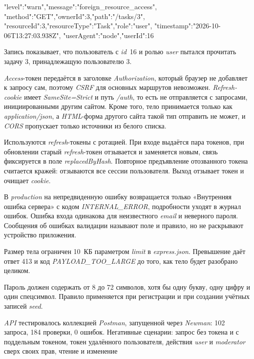 \documentclass{stp}
\begin{document}
\begin{stpnum}
\begin{stplisting}
{ "level":"warn","message":"foreign_resource_access",
 "method":"GET","ownerId":3,"path":"/tasks/3",
 "resourceId":3,"resourceType":"Task","role":"user",
 "timestamp":"2026-10-06T13:27:03.938Z",
 "userAgent":"node","userId":16}
\end{stplisting}
    Запись показывает, что пользователь с \textit{id}~16 и ролью \textit{user} пытался
    прочитать задачу 3, принадлежащую пользователю 3.
  \item \textit{Access}-токен передаётся в заголовке \textit{Authorization}, который
    браузер не добавляет к запросу сам, поэтому \textit{CSRF} для основных
    маршрутов невозможен. \textit{Refresh-cookie} имеет \textit{SameSite=Strict} и путь
    \textit{/auth}, то есть не отправляется с запросами, инициированными другим
    сайтом. Кроме того, тело принимается только как \textit{application/json},
    а \textit{HTML}-форма другого сайта такой тип отправить не может, и \textit{CORS}
    пропускает только источники из белого списка.
  \item Используются \textit{refresh}-токены с ротацией. При входе выдаётся пара
    токенов, при обновлении старый \textit{refresh}-токен отзывается и
    заменяется новым, связь фиксируется в поле \textit{replacedByHash}. Повторное
    предъявление отозванного токена считается кражей: отзываются все
    сессии пользователя. Выход отзывает токен и очищает \textit{cookie}.
  \item В \textit{production} на непредвиденную ошибку возвращается только
    «Внутренняя ошибка сервера» с кодом \textit{INTERNAL\_ERROR}, подробности
    уходят в журнал ошибок. Ошибка входа одинакова для неизвестного
    \textit{email} и неверного пароля. Сообщения об ошибках валидации называют
    поле и правило, но не раскрывают устройство приложения.
  \item Размер тела ограничен 10~КБ параметром \textit{limit} в \textit{express.json}.
    Превышение даёт ответ 413 и код \textit{PAYLOAD\_TOO\_LARGE} до того, как
    тело будет разобрано целиком.
  \item Пароль должен содержать от 8 до 72 символов, хотя бы одну
    букву, одну цифру и один спецсимвол. Правило применяется при
    регистрации и при создании учётных записей \textit{seed}.
  \item \textit{API} тестировалось коллекцией \textit{Postman}, запущенной через \textit{Newman}:
    102 запроса, 184 проверки, 0 ошибок. Негативные сценарии: запрос
    без токена и с поддельным токеном, токен удалённого пользователя,
    действия \textit{user} и \textit{moderator} сверх своих прав, чтение и изменение

\end{stpnum}
\end{document}
